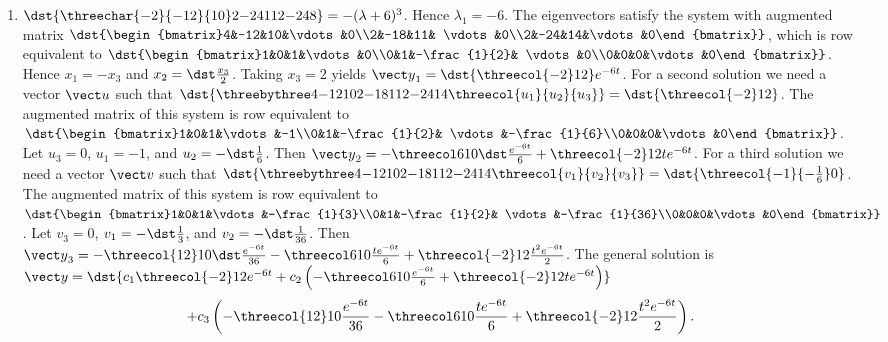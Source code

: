 \documentclass[openany]{book}
\newenvironment{sectionSolutions}{
 \begin{enumerate}[item-label={\thesection.\arabic{enumi}.}]
}{
 \end{enumerate}
}
\begin{document}
\begin{sectionSolutions}
\item
$\dst{\threechar{-2}{-12}{10}2{-24}{11}2{-24}8}
=-(\lambda+6)^3$.
Hence $\lambda_1=-6$.
The eigenvectors
 satisfy the system with  augmented matrix
$\dst{\begin{bmatrix}4&-12&10&\vdots&0\\2&-18&11&
\vdots&0\\2&-24&14&\vdots&0\end{bmatrix}}$,
which is row equivalent to
$\dst{\begin{bmatrix}1&0&1&\vdots&0\\0&1&-\frac{1}{2}&
\vdots&0\\0&0&0&\vdots&0\end{bmatrix}}$.
Hence  $x_1=-x_3$ and $x_2=\dst\frac{x_3}{2}$.  Taking $x_3=2$
yields
${\vect y}_1=\dst{\threecol{-2}12}e^{-6t}$.
For a second solution we need a vector ${\vect u}$ such that
$\dst{\threebythree4{-12}{10}2{-18}{11}2{-24}{14}\threecol{u_1}{u_2}{u_3}}
=\dst{\threecol{-2}12}$.
The augmented matrix of this system is row equivalent to
$\dst{\begin{bmatrix}1&0&1&\vdots&-1\\0&1&-\frac{1}{2}&
\vdots&-\frac{1}{6}\\0&0&0&\vdots&0\end{bmatrix}}$.
Let $u_3=0$, $u_1=-1$, and $u_2=-\dst\frac{1}{6}$. Then
${\vect y}_2=-\threecol610\dst\frac{e^{-6t}}{6}+\threecol{-2}12te^{-6t}$.
For a third solution we need a vector ${\vect v}$ such that
$\dst{\threebythree4{-12}{10}2{-18}{11}2{-24}{14}\threecol{v_1}{v_2}{v_3}}
=\dst{\threecol{-1}{-\frac{1}{6}}0}$.
The augmented matrix of this system is row equivalent to
$\dst{\begin{bmatrix}1&0&1&\vdots&-\frac{1}{3}\\0&1&-\frac{1}{2}&
\vdots&-\frac{1}{36}\\0&0&0&\vdots&0\end{bmatrix}}$.
Let $v_3=0$, $v_1=-\dst\frac{1}{3}$, and $v_2=-\dst\frac{1}{36}$. Then
${\vect y}_3= -\threecol{12}10\dst\frac{e^{-6t}}{36}-\threecol610\frac{t
e^{-6t}}{6}+\threecol{-2}12\frac{t^2e^{-6t}}{2}$.
The general solution is
 ${\vect y}=\dst{c_1\threecol{-2}12e^{-6t}+
c_2\left(-\threecol610\frac{e^{-6t}}{6}+\threecol{-2}12te^{-6t}\right)}$
\[+c_3\left(-\threecol{12}10\frac{e^{-6t}}{36}-\threecol610\frac{t
e^{-6t}}{6}+\threecol{-2}12\frac{t^2e^{-6t}}{2}\right).\]



\end{sectionSolutions}
\end{document}
